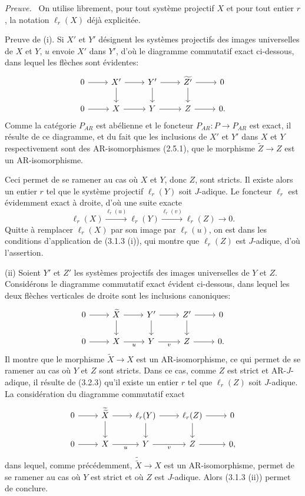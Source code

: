 \documentclass[11pt]{article}
\newenvironment{prooftext}[1][Proof]{\par\noindent\emph{#1.}\ }{\par\medskip}
\begin{document}
\begin{prooftext}[Preuve]
On utilise librement, pour tout système projectif $X$ et pour tout entier $r$, la notation $\ell_r(X)$ déjà explicitée.

Preuve de (i). Si $X'$ et $Y'$ désignent les systèmes projectifs des images universelles de $X$ et $Y$, $u$ envoie $X'$ dans $Y'$, d'où le diagramme commutatif exact ci-dessous, dans lequel les flèches sont évidentes:
\[
\begin{tikzcd}
0 \arrow[r] & X' \arrow[r] \arrow[d] & Y' \arrow[r] \arrow[d] & \widetilde{Z'} \arrow[r] \arrow[d] & 0\\
0 \arrow[r] & X \arrow[r] & Y \arrow[r] & Z \arrow[r] & 0 .
\end{tikzcd}
\]
Comme la catégorie $P_{AR}$ est abélienne et le foncteur $P_{AR}\colon P\to P_{AR}$ est exact, il résulte de ce diagramme, et du fait que les inclusions de $X'$ et $Y'$ dans $X$ et $Y$ respectivement sont des AR-isomorphismes (2.5.1), que le morphisme $\widetilde Z\to Z$ est un AR-isomorphisme.

Ceci permet de se ramener au cas où $X$ et $Y$, donc $Z$, sont stricts. Il existe alors un entier $r$ tel que le système projectif $\ell_r(Y)$ soit $J$-adique. Le foncteur $\ell_r$ est évidemment exact à droite, d'où une suite exacte
\[
\ell_r(X)\stackrel{\ell_r(u)}{\longrightarrow}\ell_r(Y)\stackrel{\ell_r(v)}{\longrightarrow}\ell_r(Z)\longrightarrow0.
\]
Quitte à remplacer $\ell_r(X)$ par son image par $\ell_r(u)$, on est dans les conditions d'application de (3.1.3 (i)), qui montre que $\ell_r(Z)$ est $J$-adique, d'où l'assertion.

(ii) Soient $Y'$ et $Z'$ les systèmes projectifs des images universelles de $Y$ et $Z$. Considérons le diagramme commutatif exact évident ci-dessous, dans lequel les deux flèches verticales de droite sont les inclusions canoniques:
\[
\begin{tikzcd}
0 \arrow[r] & \widetilde X \arrow[r] \arrow[d] & Y' \arrow[r] \arrow[d] & Z' \arrow[r] \arrow[d] & 0\\
0 \arrow[r] & X \arrow[r,"u"'] & Y \arrow[r,"v"'] & Z \arrow[r] & 0 .
\end{tikzcd}
\]
Il montre que le morphisme $\widetilde X\to X$ est un AR-isomorphisme, ce qui permet de se ramener au cas où $Y$ et $Z$ sont stricts. Dans ce cas, comme $Z$ est strict et AR-$J$-adique, il résulte de (3.2.3) qu'il existe un entier $r$ tel que $\ell_r(Z)$ soit $J$-adique. La considération du diagramme commutatif exact
\[
\begin{tikzcd}
0 \arrow[r] & \widetilde{\widetilde X} \arrow[r] \arrow[d] & \ell_r(Y) \arrow[r] \arrow[d] & \ell_r(Z) \arrow[r] \arrow[d] & 0\\
0 \arrow[r] & X \arrow[r,"u"'] & Y \arrow[r,"v"'] & Z \arrow[r] & 0,
\end{tikzcd}
\]
dans lequel, comme précédemment, $\widetilde{\widetilde X}\to X$ est un AR-isomorphisme, permet de se ramener au cas où $Y$ est strict et où $Z$ est $J$-adique. Alors (3.1.3 (ii)) permet de conclure.
\end{prooftext}
\end{document}
